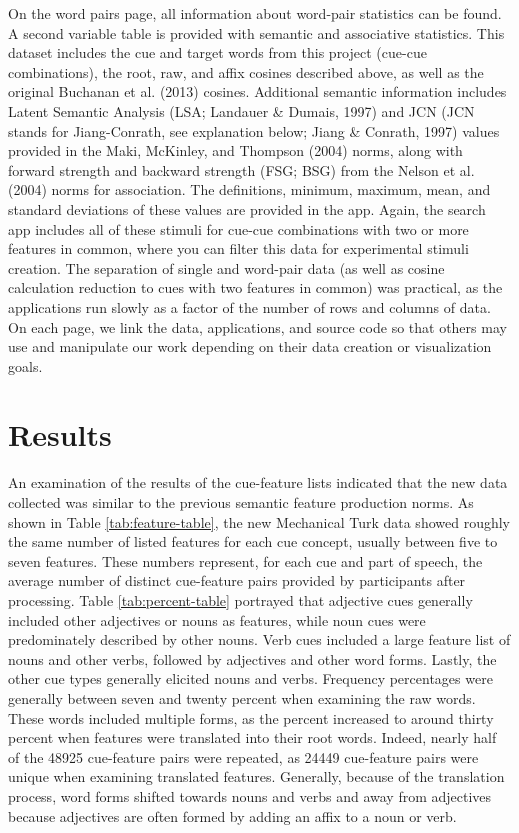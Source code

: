\documentclass[english,,man]{apa6}
\theoremstyle{definition}
\theoremstyle{definition}
\theoremstyle{definition}
\theoremstyle{remark}
\begin{document}
On the word pairs page, all information about word-pair statistics can
be found. A second variable table is provided with semantic and
associative statistics. This dataset includes the cue and target words
from this project (cue-cue combinations), the root, raw, and affix
cosines described above, as well as the original Buchanan et al. (2013)
cosines. Additional semantic information includes Latent Semantic
Analysis (LSA; Landauer \& Dumais, 1997) and JCN (JCN stands for
Jiang-Conrath, see explanation below; Jiang \& Conrath, 1997) values
provided in the Maki, McKinley, and Thompson (2004) norms, along with
forward strength and backward strength (FSG; BSG) from the Nelson et al.
(2004) norms for association. The definitions, minimum, maximum, mean,
and standard deviations of these values are provided in the app. Again,
the search app includes all of these stimuli for cue-cue combinations
with two or more features in common, where you can filter this data for
experimental stimuli creation. The separation of single and word-pair
data (as well as cosine calculation reduction to cues with two features
in common) was practical, as the applications run slowly as a factor of
the number of rows and columns of data. On each page, we link the data,
applications, and source code so that others may use and manipulate our
work depending on their data creation or visualization goals.

\section{Results}\label{results}

An examination of the results of the cue-feature lists indicated that
the new data collected was similar to the previous semantic feature
production norms. As shown in Table \ref{tab:feature-table}, the new
Mechanical Turk data showed roughly the same number of listed features
for each cue concept, usually between five to seven features. These
numbers represent, for each cue and part of speech, the average number
of distinct cue-feature pairs provided by participants after processing.
Table \ref{tab:percent-table} portrayed that adjective cues generally
included other adjectives or nouns as features, while noun cues were
predominately described by other nouns. Verb cues included a large
feature list of nouns and other verbs, followed by adjectives and other
word forms. Lastly, the other cue types generally elicited nouns and
verbs. Frequency percentages were generally between seven and twenty
percent when examining the raw words. These words included multiple
forms, as the percent increased to around thirty percent when features
were translated into their root words. Indeed, nearly half of the 48925
cue-feature pairs were repeated, as 24449 cue-feature pairs were unique
when examining translated features. Generally, because of the
translation process, word forms shifted towards nouns and verbs and away
from adjectives because adjectives are often formed by adding an affix
to a noun or verb.
\end{document}
